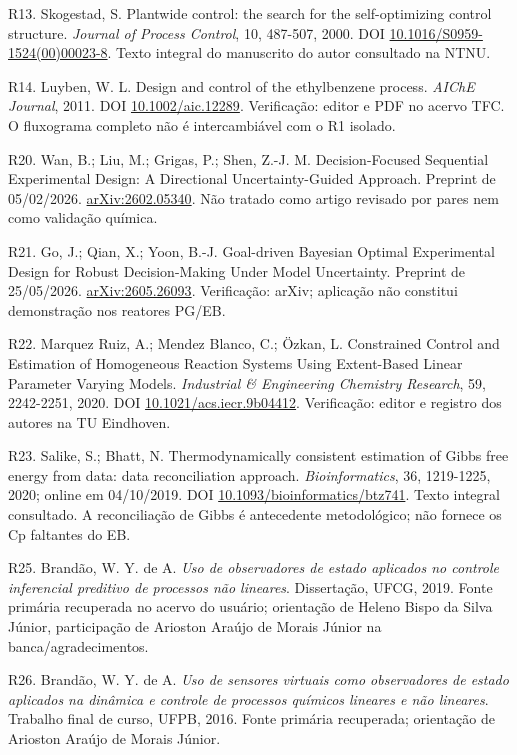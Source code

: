 \documentclass[
  11pt,
  letterpaper,
]{article}
\begin{document}
R13. Skogestad, S. Plantwide control: the search for the self-optimizing
control structure. \emph{Journal of Process Control}, 10, 487-507, 2000.
DOI
\href{https://doi.org/10.1016/S0959-1524(00)00023-8}{10.1016/S0959-1524(00)00023-8}.
Texto integral do manuscrito do autor consultado na NTNU.

R14. Luyben, W. L. Design and control of the ethylbenzene process.
\emph{AIChE Journal}, 2011. DOI
\href{https://doi.org/10.1002/aic.12289}{10.1002/aic.12289}.
Verificação: editor e PDF no acervo TFC. O fluxograma completo não é
intercambiável com o R1 isolado.

R20. Wan, B.; Liu, M.; Grigas, P.; Shen, Z.-J. M. Decision-Focused
Sequential Experimental Design: A Directional Uncertainty-Guided
Approach. Preprint de 05/02/2026.
\href{https://arxiv.org/abs/2602.05340}{arXiv:2602.05340}. Não tratado
como artigo revisado por pares nem como validação química.

R21. Go, J.; Qian, X.; Yoon, B.-J. Goal-driven Bayesian Optimal
Experimental Design for Robust Decision-Making Under Model Uncertainty.
Preprint de 25/05/2026.
\href{https://arxiv.org/abs/2605.26093}{arXiv:2605.26093}. Verificação:
arXiv; aplicação não constitui demonstração nos reatores PG/EB.

R22. Marquez Ruiz, A.; Mendez Blanco, C.; Özkan, L. Constrained Control
and Estimation of Homogeneous Reaction Systems Using Extent-Based Linear
Parameter Varying Models. \emph{Industrial \& Engineering Chemistry
Research}, 59, 2242-2251, 2020. DOI
\href{https://doi.org/10.1021/acs.iecr.9b04412}{10.1021/acs.iecr.9b04412}.
Verificação: editor e registro dos autores na TU Eindhoven.

R23. Salike, S.; Bhatt, N. Thermodynamically consistent estimation of
Gibbs free energy from data: data reconciliation approach.
\emph{Bioinformatics}, 36, 1219-1225, 2020; online em 04/10/2019. DOI
\href{https://doi.org/10.1093/bioinformatics/btz741}{10.1093/bioinformatics/btz741}.
Texto integral consultado. A reconciliação de Gibbs é antecedente
metodológico; não fornece os Cp faltantes do EB.

R25. Brandão, W. Y. de A. \emph{Uso de observadores de estado aplicados
no controle inferencial preditivo de processos não lineares}.
Dissertação, UFCG, 2019. Fonte primária recuperada no acervo do usuário;
orientação de Heleno Bispo da Silva Júnior, participação de Arioston
Araújo de Morais Júnior na banca/agradecimentos.

R26. Brandão, W. Y. de A. \emph{Uso de sensores virtuais como
observadores de estado aplicados na dinâmica e controle de processos
químicos lineares e não lineares}. Trabalho final de curso, UFPB, 2016.
Fonte primária recuperada; orientação de Arioston Araújo de Morais
Júnior.
\end{document}
